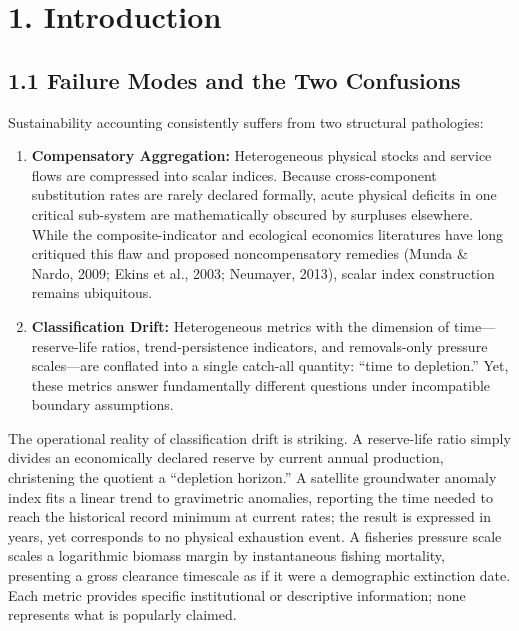 \documentclass[11pt]{article}
\begin{document}
\section*{1. Introduction}\label{introduction}

\subsection*{1.1 Failure Modes and the Two Confusions}\label{11-failure-modes-and-the-two-confusions}

Sustainability accounting consistently suffers from two structural pathologies:

\begin{enumerate}\setlength{\itemsep}{2pt}
\item \textbf{Compensatory Aggregation:} Heterogeneous physical stocks and service flows are compressed into scalar indices. Because cross-component substitution rates are rarely declared formally, acute physical deficits in one critical sub-system are mathematically obscured by surpluses elsewhere. While the composite-indicator and ecological economics literatures have long critiqued this flaw and proposed noncompensatory remedies (Munda \& Nardo, 2009; Ekins et al., 2003; Neumayer, 2013), scalar index construction remains ubiquitous.
\item \textbf{Classification Drift:} Heterogeneous metrics with the dimension of time---reserve-life ratios, trend-persistence indicators, and removals-only pressure scales---are conflated into a single catch-all quantity: ``time to depletion.'' Yet, these metrics answer fundamentally different questions under incompatible boundary assumptions.
\end{enumerate}

The operational reality of classification drift is striking. A reserve-life ratio simply divides an economically declared reserve by current annual production, christening the quotient a ``depletion horizon.'' A satellite groundwater anomaly index fits a linear trend to gravimetric anomalies, reporting the time needed to reach the historical record minimum at current rates; the result is expressed in years, yet corresponds to no physical exhaustion event. A fisheries pressure scale scales a logarithmic biomass margin by instantaneous fishing mortality, presenting a gross clearance timescale as if it were a demographic extinction date. Each metric provides specific institutional or descriptive information; none represents what is popularly claimed.
\end{document}
